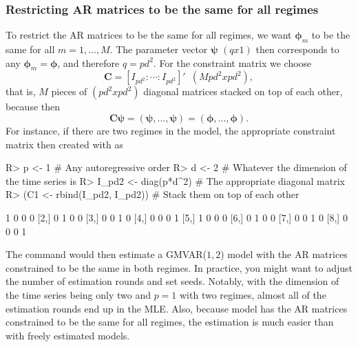 \documentclass[nojss]{jss} %
\begin{document}
\subsubsection{Restricting AR matrices to be the same for all regimes}
To restrict the AR matrices to be the same for all regimes, we want $\boldsymbol{\phi}_m$ to be the same for all $m=1,...,M$. The parameter vector $\boldsymbol{\psi}$ $(qx1)$ then corresponds to any $\boldsymbol{\phi}_m=\boldsymbol{\phi}$, and therefore $q=pd^2$. For the constraint matrix we choose
\begin{equation}
\boldsymbol{C} = [I_{pd^2}:\cdots:I_{pd^2}]' \enspace (Mpd^2xpd^2),
\end{equation}
that is, $M$ pieces of $(pd^2xpd^2)$ diagonal matrices stacked on top of each other, because then
\begin{equation}
\boldsymbol{C}\boldsymbol{\psi}=(\boldsymbol{\psi},...,\boldsymbol{\psi})=(\boldsymbol{\phi},...,\boldsymbol{\phi}).
\end{equation}
For instance, if there are two regimes in the model, the appropriate constraint matrix then created with  as
%
\begin{Schunk}
\begin{Sinput}
R> p <- 1 # Any autoregressive order
R> d <- 2 # Whatever the dimension of the time series is
R> I_pd2 <- diag(p*d^2) # The appropriate diagonal matrix
R> (C1 <- rbind(I_pd2, I_pd2)) # Stack them on top of each other
\end{Sinput}
\begin{Soutput}
     [,1] [,2] [,3] [,4]
[1,]    1    0    0    0
[2,]    0    1    0    0
[3,]    0    0    1    0
[4,]    0    0    0    1
[5,]    1    0    0    0
[6,]    0    1    0    0
[7,]    0    0    1    0
[8,]    0    0    0    1
\end{Soutput}
\end{Schunk}
%
The command  would then estimate a GMVAR($1,2$) model with the AR matrices constrained to be the same in both regimes. In practice, you might want to adjust the number of estimation rounds and set seeds. Notably, with the dimension of the time series being only two and $p=1$ with two regimes, almost all of the estimation rounds end up in the MLE. Also, because model has the AR matrices constrained to be the same for all regimes, the estimation is much easier than with freely estimated models.
\end{document}
